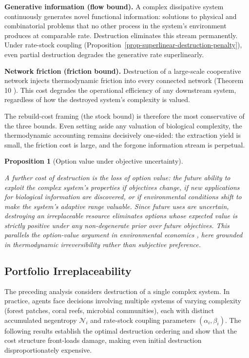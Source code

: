 \documentclass[11pt]{article}
\theoremstyle{plain}
\newtheorem{proposition}[theorem]{Proposition}
\theoremstyle{definition}
\theoremstyle{remark}
\let\origsubsection\subsection
\renewcommand{\subsection}{\needspace{7\baselineskip}\origsubsection}
\begin{document}
\textbf{Generative information (flow bound).} A complex dissipative
system continuously generates novel functional information: solutions to
physical and combinatorial problems that no other process in the
system's environment produces at comparable rate. Destruction eliminates
this stream permanently. Under rate-stock coupling
(Proposition~\ref{prop-superlinear-destruction-penalty}), even partial
destruction degrades the generative rate superlinearly.

\textbf{Network friction (friction bound).} Destruction of a large-scale
cooperative network injects thermodynamic friction into every connected
network (Theorem 10 \citep{TC-IV}). This cost degrades the operational
efficiency of any downstream system, regardless of how the destroyed
system's complexity is valued.

The rebuild-cost framing (the stock bound) is therefore the most
conservative of the three bounds. Even setting aside any valuation of
biological complexity, the thermodynamic accounting remains decisively
one-sided: the extraction yield is small, the friction cost is large,
and the forgone information stream is perpetual.

\begin{proposition}[Option value under objective uncertainty]
\label{rem-option-value}

A further cost of destruction is the loss of \emph{option value}: the future ability to exploit the complex system's properties if objectives change, if new applications for biological information are discovered, or if environmental conditions shift to make the system's adaptive range valuable. Since future uses are uncertain, destroying an irreplaceable resource eliminates options whose expected value is strictly positive under any non-degenerate prior over future objectives. This parallels the option-value argument in environmental economics \citep{ArrowFisher1974,DixitPindyck1994}, here grounded in thermodynamic irreversibility rather than subjective preference.
\end{proposition}

\subsection{Portfolio
Irreplaceability}\label{portfolio-irreplaceability}

The preceding analysis considers destruction of a single complex system.
In practice, agents face decisions involving multiple systems of varying
complexity (forest patches, coral reefs, microbial communities), each
with distinct accumulated negentropy \(\mathcal{N}_i\) and rate-stock
coupling parameters \((\alpha_i, \beta_i)\). The following results
establish the optimal destruction ordering and show that the cost
structure front-loads damage, making even initial destruction
disproportionately expensive.
\end{document}
